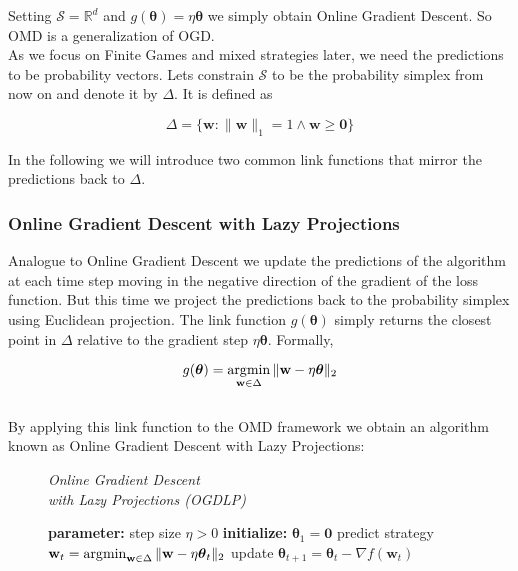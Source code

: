Setting $\mathcal{S}= \mathbb{R}^d$ and $g(\boldsymbol{\theta}) = \eta\boldsymbol{\theta}$ we simply obtain Online Gradient Descent. So OMD is a generalization of OGD. \\

As we focus on Finite Games and mixed strategies later, we need the predictions to be probability vectors. Lets constrain $\mathcal{S}$ to be the probability simplex from now on and denote it by $\Delta$. It is defined as 

\begin{equation*}
    \Delta = \{\textbf{w}: \|\textbf{w}\|_1 = 1 \land \textbf{w} \ge \textbf{0}\}
\end{equation*}

In the following we will introduce two common link functions that mirror the predictions back to $\Delta$. 

\subsubsection{Online Gradient Descent with Lazy Projections}\label{subsubsection:OnlineGradientDescentWithLazyProjections}

Analogue to Online Gradient Descent we update the predictions of the algorithm at each time step moving in the negative direction of the gradient of the loss function. But this time we project the predictions back to the probability simplex using Euclidean projection. The link function $g(\boldsymbol{\theta})$ simply returns the closest point in $\Delta$ relative to the gradient step $\eta\boldsymbol{\theta}$. Formally, 

\begin{equation*}
    g(\boldsymbol{\theta}) = \operatorname*{\arg\!\min}_{\textbf{w} \in \Delta} \|\textbf{w} - \eta\boldsymbol{\theta}\|_2
\end{equation*} \\

By applying this link function to the OMD framework we obtain an algorithm known as Online Gradient Descent with Lazy Projections:

\begin{figure}[H]\centering
    \textit{Online Gradient Descent \\ with Lazy Projections (OGDLP)} 
    \begin{minipage}{.7\linewidth}
        \begin{algorithm}[H]
        \DontPrintSemicolon
        \textbf{parameter: } step size $\eta > 0$ \;
        \textbf{initialize: } $\boldsymbol{\theta}_1 = \textbf{0}$ \;
         {
        predict strategy $\textbf{w}_t = \operatorname*{\arg\!\min}_{\textbf{w} \in \Delta} \|\textbf{w} - \eta\boldsymbol{\theta}_t\|_2$ \;
        update $\boldsymbol{\theta}_{t+1} = \boldsymbol{\theta}_t - \nabla f(\textbf{w}_t)$ \;
        }
        \end{algorithm}\caption*{}
  \end{minipage}
\end{figure}

